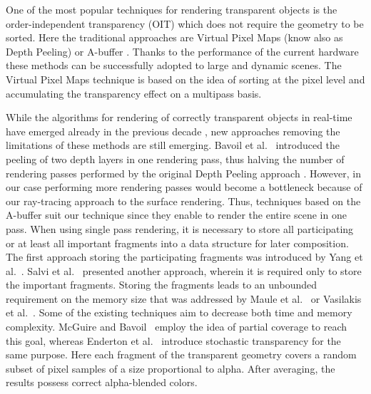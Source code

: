One of the most popular techniques for rendering transparent objects is the order-independent transparency (OIT) which does not require the geometry to be sorted.
Here the traditional approaches are Virtual Pixel Maps (know also as Depth Peeling) \cite{mammen1989transparency} or A-buffer \cite{carpenter1984abuffer}.
Thanks to the performance of the current hardware these methods can be successfully adopted to large and dynamic scenes.
The Virtual Pixel Maps technique is based on the idea of sorting at the pixel level and accumulating the transparency effect on a multipass basis. 

While the algorithms for rendering of correctly transparent objects in real-time have emerged already in the previous decade \cite{everitt2001interactive}, new approaches removing the limitations of these methods are still emerging.
Bavoil et al.~\cite{bavoil2008order} introduced the peeling of two depth layers in one rendering pass, thus halving the number of rendering passes performed by the original Depth Peeling approach \cite{everitt2001interactive}. However, in our case performing more rendering passes would become a bottleneck because of our ray-tracing approach to the surface rendering.
Thus, techniques based on the A-buffer suit our technique since they enable to render the entire scene in one pass.
When using single pass rendering, it is necessary to store all participating or at least all important fragments into a data structure for later composition.
The first approach storing the participating fragments was introduced by Yang et al.~\cite{yang2010real}. Salvi et al.~\cite{salvi2011adaptive} presented another approach, wherein it is required only to store the important fragments.
Storing the fragments leads to an unbounded requirement on the memory size that was addressed by Maule et al.~\cite{maule2012memory} or Vasilakis et al.~\cite{vasilakis2015k+buffer}.
Some of the existing techniques aim to decrease both time and memory complexity.
McGuire and Bavoil~\cite{mcguire2013weighted} employ the idea of partial coverage to reach this goal, whereas Enderton et al.~\cite{enderton2011stochastic} introduce stochastic transparency for the same purpose. 
Here each fragment of the transparent geometry covers a random subset of pixel samples of a size proportional to alpha. 
After averaging, the results possess correct alpha-blended colors. 

